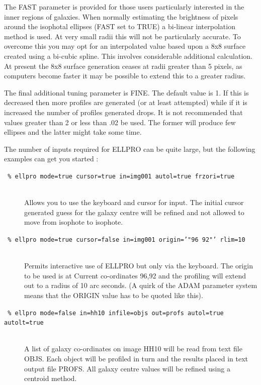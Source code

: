 \documentclass[twoside,11pt]{article}
\begin{document}
The FAST parameter is provided for those users particularly interested in the
inner regions of galaxies. When normally estimating the brightness of
pixels around the isophotal ellipses (FAST set to TRUE) a bi-linear
interpolation method is used. At very small radii this will not be
particularly accurate. To overcome this you may opt for an
interpolated value based upon a 8x8 surface created using a
bi-cubic spline. This involves considerable additional calculation.
At present the 8x8 surface generation ceases at radii greater than
5 pixels, as computers become faster it may be possible to extend this
to a greater radius.

The final additional tuning parameter is FINE. The default value is 1.
If this is decreased then more profiles are generated
(or at least attempted)  while if it is increased the number of
profiles generated drops. It is not recommended that values greater
than 2 or less than .02 be used. The former will produce few ellipses
and the latter might take some time.

The number of inputs required for ELLPRO can be quite large, but the
following examples can get you started :

\begin{description}
\item[{\tt
   \% ellpro mode=true cursor=true in=img001 autol=true frzori=true}]
   \mbox{}\\
  Allows you to use the keyboard and cursor for input. The initial
  cursor generated guess for the galaxy centre will be refined and
  not allowed to move from isophote to isophote.
\item[{\tt
   \% ellpro mode=true cursor=false in=img001 origin='"96 92"' rlim=10}]
   \mbox{}\\
  Permits interactive use of ELLPRO but only via the keyboard. The origin
  to be used is at Current co-ordinates 96,92 and the profiling will extend
  out to a radius of 10 arc seconds.
  (A quirk of the ADAM parameter system means that the ORIGIN value has
  to be quoted like this).
\item[{\tt
   \% ellpro mode=false in=hh10 infile=objs out=profs autol=true autolt=true}]
   \mbox{}\\
  A list of galaxy co-ordinates on image HH10 will be read from text
  file OBJS. Each object will be profiled in turn and the results placed
  in text output file PROFS. All galaxy centre values will be refined
  using a centroid method.
\end{description}
\end{document}
